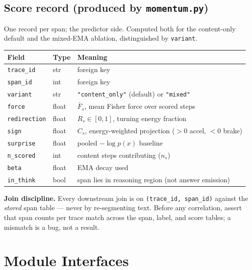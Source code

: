 \documentclass[11pt]{article}
\newcommand{\modu}[1]{\texttt{#1}}
\begin{document}
\subsection{Score record (produced by \modu{momentum.py})}
One record per span; the predictor side. Computed both for the content-only default and the mixed-EMA ablation, distinguished by \texttt{variant}.
\begin{center}
\begin{tabular}{@{}l l p{}@{}}
\toprule
\textbf{Field} & \textbf{Type} & \textbf{Meaning} \\
\midrule
\texttt{trace\_id}     & str    & foreign key \\
\texttt{span\_id}      & int    & foreign key \\
\texttt{variant}       & str    & \texttt{"content\_only"} (default) or \texttt{"mixed"} \\
\texttt{force}         & float  & $\bar F_s$, mean Fisher force over scored steps \\
\texttt{redirection}   & float  & $R_s\in[0,1]$, turning energy fraction \\
\texttt{sign}          & float  & $C_s$, energy-weighted projection ($>0$ accel, $<0$ brake) \\
\texttt{surprise}      & float  & pooled $-\log p(x)$ baseline \\
\texttt{n\_scored}     & int    & content steps contributing ($n_s$) \\
\texttt{beta}          & float  & EMA decay used \\
\texttt{in\_think}     & bool   & span lies in reasoning region (not answer emission) \\
\bottomrule
\end{tabular}
\end{center}

\begin{notebox}
\textbf{Join discipline.} Every downstream join is on \texttt{(trace\_id, span\_id)} against the \emph{stored} span table --- never by re-segmenting text. Before any correlation, assert that span counts per trace match across the span, label, and score tables; a mismatch is a bug, not a result.
\end{notebox}

\section{Module Interfaces}
\label{sec:interfaces}
\end{document}
